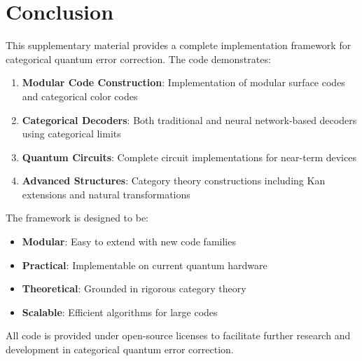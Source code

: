 \documentclass[12pt,a4paper]{article}
\begin{document}
\section{Conclusion}

This supplementary material provides a complete implementation framework for categorical quantum error correction. The code demonstrates:

\begin{enumerate}
\item \textbf{Modular Code Construction}: Implementation of modular surface codes and categorical color codes
\item \textbf{Categorical Decoders}: Both traditional and neural network-based decoders using categorical limits
\item \textbf{Quantum Circuits}: Complete circuit implementations for near-term devices
\item \textbf{Advanced Structures}: Category theory constructions including Kan extensions and natural transformations
\end{enumerate}

The framework is designed to be:
\begin{itemize}
\item \textbf{Modular}: Easy to extend with new code families
\item \textbf{Practical}: Implementable on current quantum hardware
\item \textbf{Theoretical}: Grounded in rigorous category theory
\item \textbf{Scalable}: Efficient algorithms for large codes
\end{itemize}

All code is provided under open-source licenses to facilitate further research and development in categorical quantum error correction.
\end{document}
